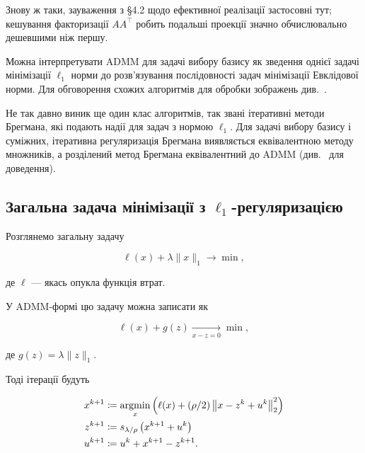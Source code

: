 \begin{remark}
    Знову ж таки, зауваження з \S4.2 щодо ефективної реалізації застосовні тут; кешування факторизації $A A^\intercal$ робить подальші проекції значно обчислювально дешевшими ніж першу.
\end{remark}

\begin{remark}
    Можна інтерпретувати ADMM для задачі вибору базису як зведення однієї задачі мінімізації $\ell_1$ норми до розв'язування послідовності задач мінімізації Евклідової норми. Для обговорення схожих алгоритмів для обробки зображень див.~\cite{2}.
\end{remark}

\begin{remark}
    Не так давно виник ще один клас алгоритмів, так звані ітеративні методи Брегмана, які подають надії для задач з нормою $\ell_1$. Для задачі вибору базису і суміжних, ітеративна регуляризація Брегмана \cite{176} виявляється еквівалентною методу множників, а розділений метод Брегмана \cite{88} еквівалентний до ADMM (див.~\cite{68} для доведення).
\end{remark}

\subsection{Загальна задача мінімізації з \texorpdfstring{$\ell_1$}{l1}-ре\-гу\-ля\-ри\-за\-ці\-є\-ю}

Розглянемо загальну задачу

\begin{equation}
    \label{eq:generic-ell-1}
    \ell(x) + \lambda \|x\|_1 \to \min,
\end{equation}

де $\ell$ --- якась опукла функція втрат. \medskip

У ADMM-формі цю задачу можна записати як

\begin{equation}
    \ell(x) + g(z) \xrightarrow[x - z = 0]{} \min,
\end{equation}

де $g(z) = \lambda \|z\|_1$. \medskip

Тоді ітерації будуть

\begin{align}
    x^{k + 1} &\coloneqq \operatorname*{argmin}_x \left( \ell(x) + (\rho / 2) \left\| x - z^k + u^k \right\|_2^2 \right) \\
    z^{k + 1} &\coloneqq s_{\lambda / \rho} \left( x^{k + 1} + u^k \right) \\
    u^{k + 1} &\coloneqq u^k + x^{k + 1} - z^{k + 1}.
\end{align}

